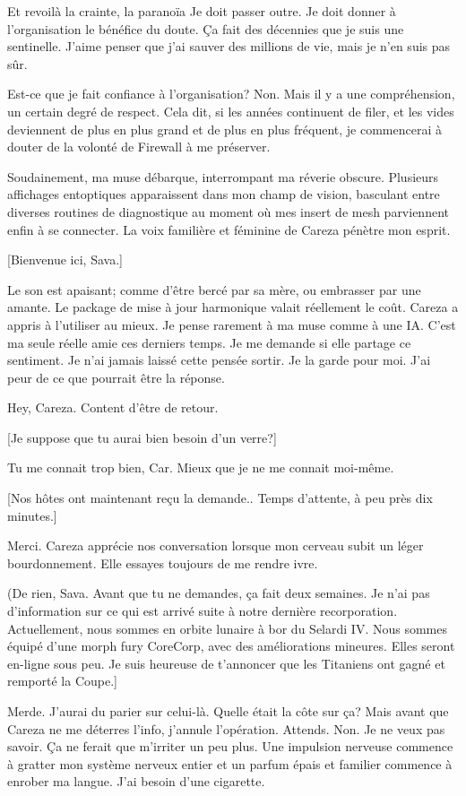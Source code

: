 Et revoilà la crainte, la paranoïa Je doit passer outre. Je doit donner à l'organisation le bénéfice du doute. Ça fait des décennies que je suis une sentinelle. J'aime penser que j'ai sauver des millions de vie, mais je n'en suis pas sûr. 

Est-ce que je fait confiance à l'organisation? Non. Mais il y a une compréhension, un certain degré de respect. Cela dit, si les années continuent de filer, et les vides deviennent de plus en plus grand et de  plus en plus fréquent, je commencerai à douter de la volonté de Firewall à me préserver. 

Soudainement, ma muse débarque, interrompant ma réverie obscure. Plusieurs affichages entoptiques apparaissent dans mon champ de vision, basculant entre diverses routines de diagnostique au moment où mes insert de mesh parviennent enfin à se connecter. La voix familière et féminine de Careza pénètre mon esprit. 

[Bienvenue ici, Sava.] 

Le son est apaisant; comme d'être bercé par sa mère, ou embrasser par une amante. Le package de mise à jour harmonique valait réellement le coût. Careza a appris à l'utiliser au mieux. Je pense rarement à ma muse comme à une IA. C'est ma seule réelle amie ces derniers temps. Je me demande si elle partage ce sentiment. Je n'ai jamais laissé cette pensée sortir. Je la garde pour moi. J'ai peur de ce que pourrait être la réponse. 

Hey, Careza. Content d'être de retour. 

[Je suppose que tu aurai bien besoin d'un verre?] 

Tu me connait trop bien, Car. Mieux que je ne me connait moi-même. 

[Nos hôtes ont maintenant reçu la demande.. Temps d'attente, à peu près dix minutes.] 

Merci. Careza apprécie nos conversation lorsque mon cerveau subit un léger bourdonnement. Elle essayes toujours de me rendre ivre. 

(De rien, Sava. Avant que tu ne demandes, ça fait deux semaines. Je n'ai pas d'information sur ce qui est arrivé suite à notre dernière recorporation. Actuellement, nous sommes en orbite lunaire à bor du Selardi IV. Nous sommes équipé d'une morph fury CoreCorp, avec des améliorations mineures. Elles seront en-ligne sous peu. Je suis heureuse de t'annoncer que les Titaniens ont gagné et remporté la Coupe.] 

Merde. J'aurai du parier sur celui-là. Quelle était la côte sur ça? Mais avant que Careza ne me déterres l'info, j'annule l'opération. Attends. Non. Je ne veux pas savoir. Ça ne ferait que m'irriter un peu plus. Une impulsion nerveuse commence à gratter mon système nerveux entier et un parfum épais et familier commence à enrober ma langue. J'ai besoin d'une cigarette. 

